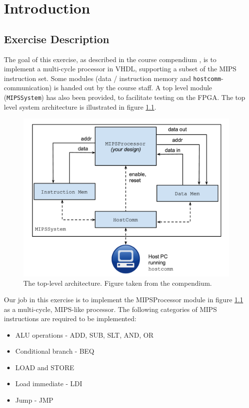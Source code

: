 \chapter{Introduction}

\section{Exercise Description}

The goal of this exercise, as described in the course compendium \cite{compendium}, is to implement a multi-cycle processor in VHDL, supporting a subset of the MIPS instruction set.
Some modules (data / instruction memory and \texttt{hostcomm}-communication) is handed out by the course staff.
A top level module (\texttt{MIPSSystem}) has also been provided, to facilitate testing on the FPGA.
The top level system architecture is illustrated in figure \ref{fig:sysarch}.


\begin{figure}[h!]
    \includegraphics[width=\linewidth]{img/sysarch.png}
    \caption{The top-level architecture. Figure taken from the compendium. \cite[p. 48]{compendium}}
    \label{fig:sysarch}
\end{figure}

\newpage
Our job in this exercise is to implement the MIPSProcessor module in figure \ref{fig:sysarch} as a multi-cycle, MIPS-like processor.
The following categories of MIPS instructions are required to be implemented:

\begin{itemize}
    \item ALU operations - ADD, SUB, SLT, AND, OR
    \item Conditional branch - BEQ
    \item LOAD and STORE
    \item Load immediate - LDI
    \item Jump - JMP
\end{itemize}

